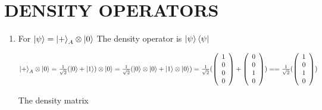 \documentclass{article}
\begin{document}
\section*{DENSITY OPERATORS}
\begin{enumerate}
    \item For $\ket{\psi}=\ket{+}_A\otimes\ket{0}$
          The density operator is $\ket{\psi}\bra{\psi}$

          $\ket{+}_A\otimes\ket{0}=\frac{1}{\sqrt{2}}(\ket{0}+\ket{1})\otimes\ket{0}=\frac{1}{\sqrt{2}}(\ket{0}\otimes\ket{0}+\ket{1}\otimes\ket{0})
              \\=\frac{1}{\sqrt{2}}(\left(\begin{array}{c}
                      1 \\0\\0\\0
                  \end{array}\right)+\left(\begin{array}{c}
                      0 \\0\\1\\0
                  \end{array}\right))
              \\==\frac{1}{\sqrt{2}}(\left(\begin{array}{c}
                      1 \\0\\1\\0
                  \end{array}\right))
          $

          The density matrix


\end{enumerate}
\end{document}
